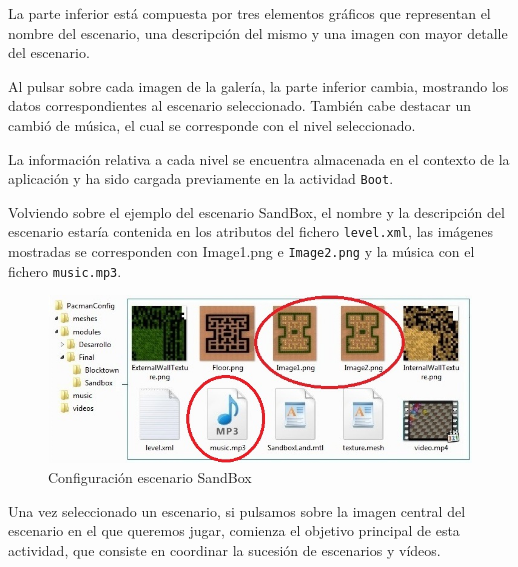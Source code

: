 La parte inferior está compuesta por tres elementos gráficos que representan el nombre del escenario, una descripción del mismo y una imagen con mayor detalle del escenario. 
\newline

Al pulsar sobre cada imagen de la galería, la parte inferior cambia, mostrando los datos correspondientes al escenario seleccionado. También cabe destacar un cambió de música, el cual se corresponde con el nivel seleccionado.
\newline

La información relativa a cada nivel se encuentra almacenada en el contexto de la aplicación y ha sido cargada previamente en la actividad \texttt{Boot}.
\newline

Volviendo sobre el ejemplo del escenario SandBox, el nombre y la descripción del escenario estaría contenida en los atributos del fichero \texttt{level.xml}, las imágenes mostradas se corresponden con {Image1.png} e \texttt{Image2.png} y la música con el fichero \texttt{music.mp3}.
\newline
 
\begin{figure}[h!]
	\centering	
	\includegraphics[width=15cm]{img/Sandbox2.jpg}
	\caption{Configuración escenario SandBox}
\end{figure}

Una vez seleccionado un escenario, si pulsamos sobre la imagen central del escenario en el que queremos jugar, comienza el objetivo principal de esta actividad, que consiste en coordinar la sucesión de escenarios y vídeos.
\newline

